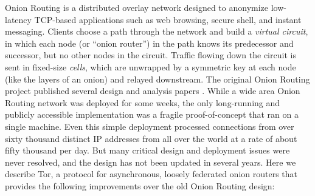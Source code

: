 \documentclass[times,10pt,twocolumn]{article}
\begin{document}
Onion Routing is a distributed overlay network designed to anonymize
low-latency TCP-based applications such as web browsing, secure shell,
and instant messaging. Clients choose a path through the network and
build a \emph{virtual circuit}, in which each node (or ``onion router'')
in the path knows its predecessor and successor, but no other nodes in
the circuit.  Traffic flowing down the circuit is sent in fixed-size
\emph{cells}, which are unwrapped by a symmetric key at each node
(like the layers of an onion) and relayed downstream. The original
Onion Routing project published several design and analysis papers
\cite{or-ih96,or-jsac98,or-discex00,or-pet00}. While a wide area Onion
Routing network was deployed for some weeks, the only long-running and
publicly accessible implementation was a fragile
proof-of-concept that ran on a single machine. Even this simple deployment
processed connections from over sixty thousand distinct IP addresses from
all over the world at a rate of about fifty thousand per day.
But many critical design and deployment issues were never
resolved, and the design has not been updated in several years. Here
we describe Tor, a protocol for asynchronous, loosely federated onion
routers that provides the following improvements over the old Onion
Routing design:
\end{document}
